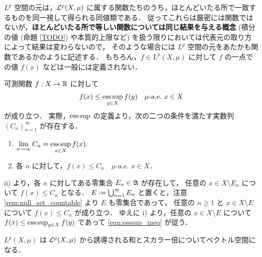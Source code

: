 \begin{remark}
    $L^p$ 空間の元は，$\mathcal{L}^p(X,\mu)$ に属する関数たちのうち，ほとんどいたる所で一致するものを同一視して得られる同値類である．
    従ってこれらは厳密には関数ではないが，\textbf{ほとんどいたる所で等しい関数については同じ結果を与える概念}
    (積分の値 (命題 \ref{TODO}) や本質的上限など) を扱う限りにおいては代表元の取り方によって結果は変わらないので，
    そのような場合には $L^p$ 空間の元をあたかも関数であるかのように記述する．
    もちろん，$f\in L^p(X,\mu)$ に対して $f$ の一点での値 $f(x)$ などは一般には定義されない．
\end{remark}

\begin{remark}\label{rem:pointwise_esssup}
    可測関数 $f:X\to\mathbb{R}$ に対して
    \begin{align}
        f(x)\le\operatorname*{ess\,sup}_{y\in X}f(y)\quad\text{$\mu$-a.e.\ $x\in X$}
        \label{eqn:esssup_ineq}
    \end{align}
    が成り立つ．
    実際，$\operatorname*{ess\,sup}$ の定義より，次の二つの条件を満たす実数列 $(C_n)_{n=1}^\infty$ が存在する．
    \begin{enumerate}
        \item $\displaystyle\lim_{n\to\infty}C_n=\operatorname*{ess\,sup}_{x\in X}f(x).$
        \item 各 $n$ に対して，$f(x)\le C_n\quad\text{$\mu$-a.e.\ $x\in X$}$．
    \end{enumerate}
    \textrm{ii)} より，各 $n$ に対してある零集合 $E_n\in\mathfrak{A}$ が存在して，
    任意の $x\in X\setminus E_n$ について $f(x)\le C_n$ となる．
    $E\defeq\bigcup_{n=1}^\infty E_n$ と置くと，注意 \ref{rem:null_set_countable} より $E$ も零集合であって，
    任意の $n\ge1$ と $x\in X\setminus E$ について $f(x)\le C_n$ が成り立つ．
    ゆえに \textrm{i)} より，任意の $x\in X\setminus E$ について $f(x)\le\operatorname*{ess\,sup}_{y\in X}f(y)$ であって
    \eqref{eqn:esssup_ineq} が従う．
\end{remark}

\begin{proposition}
    $L^p(X,\mu)$ は $\mathcal{L}^p(X,\mu)$ から誘導される和とスカラー倍についてベクトル空間になる．
\end{proposition}

